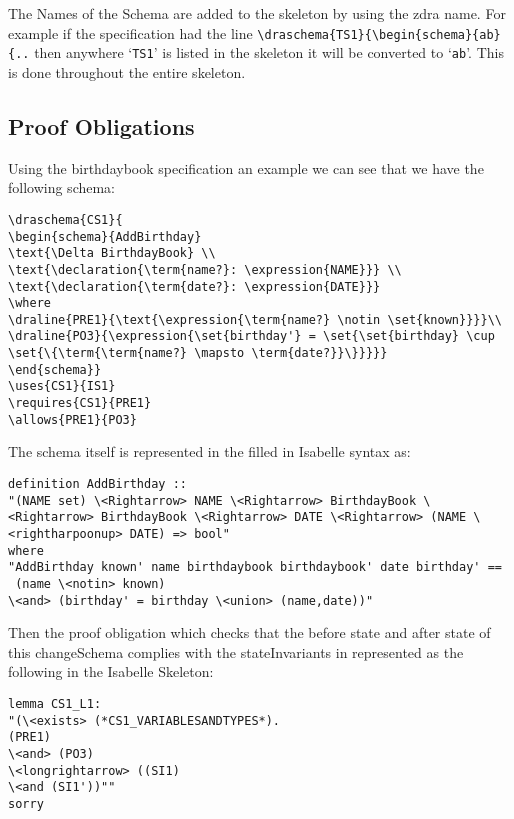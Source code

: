 The Names of the Schema are added to the skeleton by using the \gls{zdra} name. For example if the specification had the line \verb|\draschema{TS1}{\begin{schema}{ab}{..| then anywhere `\texttt{TS1}' is listed in the skeleton it will be converted to `\texttt{ab}'. This is done throughout the entire skeleton.

\subsection{Proof Obligations}

Using the birthdaybook specification an example we can see that we have the following schema:

\begin{verbatim}
\draschema{CS1}{
\begin{schema}{AddBirthday}
\text{\Delta BirthdayBook} \\
\text{\declaration{\term{name?}: \expression{NAME}}} \\
\text{\declaration{\term{date?}: \expression{DATE}}}
\where
\draline{PRE1}{\text{\expression{\term{name?} \notin \set{known}}}}\\
\draline{PO3}{\expression{\set{birthday'} = \set{\set{birthday} \cup \set{\{\term{\term{name?} \mapsto \term{date?}}\}}}}}
\end{schema}}
\uses{CS1}{IS1}
\requires{CS1}{PRE1}
\allows{PRE1}{PO3}
\end{verbatim}

The schema itself is represented in the filled in Isabelle syntax as:

\begin{verbatim}
definition AddBirthday :: 
"(NAME set) \<Rightarrow> NAME \<Rightarrow> BirthdayBook \<Rightarrow> BirthdayBook \<Rightarrow> DATE \<Rightarrow> (NAME \<rightharpoonup> DATE) => bool"
where 
"AddBirthday known' name birthdaybook birthdaybook' date birthday' ==
 (name \<notin> known)
\<and> (birthday' = birthday \<union> (name,date))"
\end{verbatim}

Then the proof obligation which checks that the before state and after state of this changeSchema complies with the stateInvariants in represented as the following in the Isabelle Skeleton:

\begin{verbatim}
lemma CS1_L1:
"(\<exists> (*CS1_VARIABLESANDTYPES*).
(PRE1)
\<and> (PO3)
\<longrightarrow> ((SI1)
\<and (SI1'))""
sorry
\end{verbatim}

